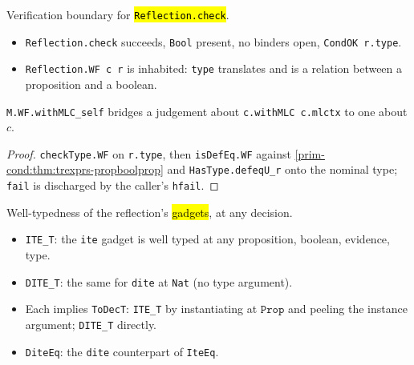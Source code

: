 \begin{lemma}
  \label{prim-cond:thm:reflection-check-wf}
  \leanok

   Verification boundary for \hl{\texttt{Reflection.check}}.
  \begin{itemize}
  \item {} \texttt{Reflection.check} succeeds, \texttt{Bool} present, no binders open,
    \texttt{CondOK r.type}.
  \item {} \texttt{Reflection.WF c r} is inhabited: \texttt{type} translates and is a
    relation between a proposition and a boolean.
  \end{itemize}
  \texttt{M.WF.withMLC\_self} bridges a judgement about \texttt{c.withMLC c.mlctx} to one about
  $c$.
\end{lemma}
\begin{proof}
  \leanok
   \texttt{checkType.WF} on \texttt{r.type}, then \texttt{isDefEq.WF} against
  \ref{prim-cond:thm:trexprs-propboolprop} and \texttt{HasType.defeqU\_r} onto the nominal type;
  \texttt{fail} is discharged by the caller's \texttt{hfail}.
\end{proof}

\begin{definition}
  \label{prim-cond:def:reflection-ite-t}
  \leanok

   Well-typedness of the reflection's \hl{gadgets}, at any decision.
  \begin{itemize}
  \item \texttt{ITE\_T}: the \texttt{ite} gadget is well typed at any proposition, boolean,
    evidence, type.
  \item \texttt{DITE\_T}: the same for \texttt{dite} at \texttt{Nat} (no type argument).
  \item Each implies \texttt{ToDecT}: \texttt{ITE\_T} by instantiating at $\mathtt{Prop}$ and
    peeling the instance argument; \texttt{DITE\_T} directly.
  \item \texttt{DiteEq}: the \texttt{dite} counterpart of \texttt{IteEq}.
  \end{itemize}
\end{definition}

